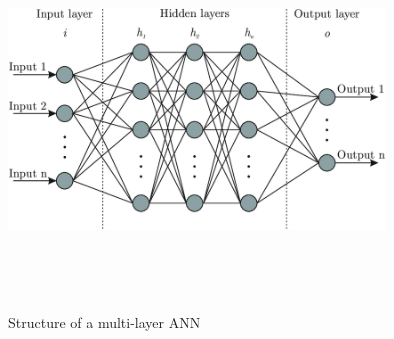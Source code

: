 \begin{figure}[H]
    \centering
    \includegraphics[width=10cm,height=10cm,keepaspectratio]{Background/ann.png}
    \caption{Structure of a multi-layer ANN}
    \label{ann}
\end{figure}


